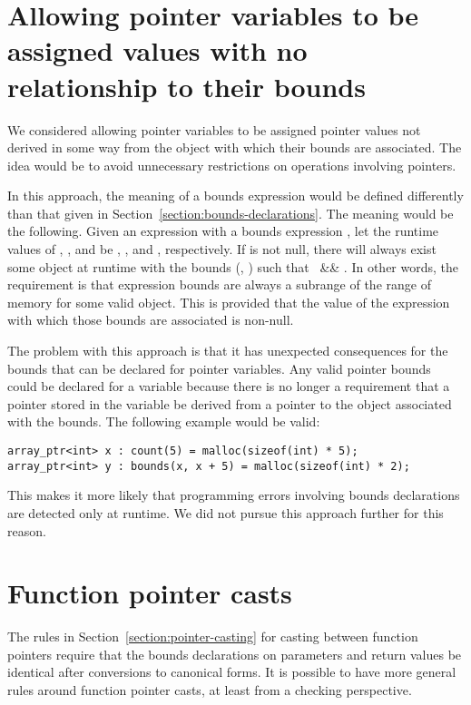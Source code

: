 \section{Allowing pointer variables to be assigned values with no relationship to their bounds}

We considered allowing pointer variables to be assigned pointer values
not derived in some way from the object with which their bounds are
associated. The idea would be to avoid unnecessary restrictions on
operations involving pointers.

In this approach, the meaning of a bounds expression would be defined
differently than that given in Section~\ref{section:bounds-declarations}. 
The meaning would be the
following. Given an expression  with a bounds expression
, let the runtime
values of , , and  be , ,
and , respectively. If  is not null, there will
always exist some object at runtime with the bounds (,
) such that  \code{<=} \ \&\&
 \code{<=} . In other words, the
requirement is that expression bounds are always a subrange of the range
of memory for some valid object. This is provided that the value of the
expression with which those bounds are associated is non-null.

The problem with this approach is that it has unexpected consequences
for the bounds that can be declared for pointer variables.
Any valid pointer bounds could be declared for a variable because there
is no longer a requirement that a pointer stored in the variable be
derived from a pointer to the object associated with the bounds. The
following example would be valid:

\begin{lstlisting}
array_ptr<int> x : count(5) = malloc(sizeof(int) * 5);
array_ptr<int> y : bounds(x, x + 5) = malloc(sizeof(int) * 2);
\end{lstlisting}

This makes it more likely that programming errors involving bounds
declarations are detected only at runtime.   We did not pursue
this approach further for this reason.

\section{Function pointer casts}

The rules in Section~\ref{section:pointer-casting} for casting between function
pointers require that the bounds declarations on parameters and return values be
identical after conversions to canonical forms.   It is possible to have
more general rules around function pointer casts, at least from a checking
perspective.

